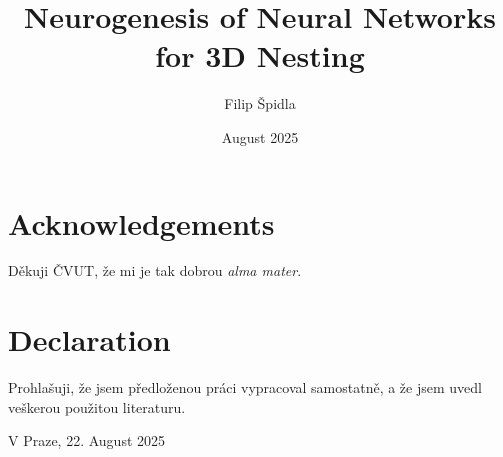 \documentclass[12pt,a4paper]{report}
\title{Neurogenesis of Neural Networks for 3D Nesting}
\author{Filip Špidla}
\date{August 2025}
\begin{document}
\maketitle

\chapter*{Acknowledgements}
Děkuji ČVUT, že mi je tak dobrou \textit{alma mater}.

\chapter*{Declaration}
Prohlašuji, že jsem předloženou práci vypracoval samostatně, a že jsem uvedl veškerou použitou literaturu.

\vspace{1cm}
V Praze, 22. August 2025

\tableofcontents
\listoffigures
\listoftables












\end{document}

